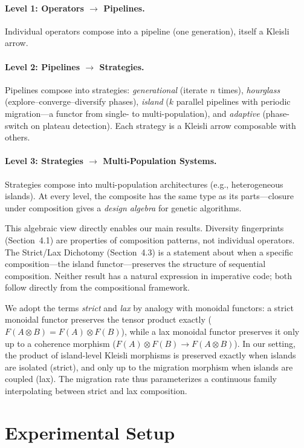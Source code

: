 \documentclass[sigconf]{acmart}
\begin{document}
\paragraph{Level 1: Operators $\to$ Pipelines.}
Individual operators compose into a pipeline (one generation), itself a Kleisli arrow.

\paragraph{Level 2: Pipelines $\to$ Strategies.}
Pipelines compose into strategies: \emph{generational} (iterate $n$ times), \emph{hourglass} (explore--converge--diversify phases), \emph{island} ($k$ parallel pipelines with periodic migration---a functor from single- to multi-population), and \emph{adaptive} (phase-switch on plateau detection). Each strategy is a Kleisli arrow composable with others.

\paragraph{Level 3: Strategies $\to$ Multi-Population Systems.}
Strategies compose into multi-population architectures (e.g., heterogeneous islands). At every level, the composite has the same type as its parts---closure under composition gives a \emph{design algebra} for genetic algorithms.

This algebraic view directly enables our main results. Diversity fingerprints (Section~4.1) are properties of composition patterns, not individual operators. The Strict/Lax Dichotomy (Section~4.3) is a statement about when a specific composition---the island functor---preserves the structure of sequential composition. Neither result has a natural expression in imperative code; both follow directly from the compositional framework.

We adopt the terms \emph{strict} and \emph{lax} by analogy with monoidal functors: a strict monoidal functor preserves the tensor product exactly ($F(A \otimes B) = F(A) \otimes F(B)$), while a lax monoidal functor preserves it only up to a coherence morphism ($F(A) \otimes F(B) \to F(A \otimes B)$). In our setting, the product of island-level Kleisli morphisms is preserved exactly when islands are isolated (strict), and only up to the migration morphism when islands are coupled (lax). The migration rate thus parameterizes a continuous family interpolating between strict and lax composition.

\section{Experimental Setup}
\end{document}
